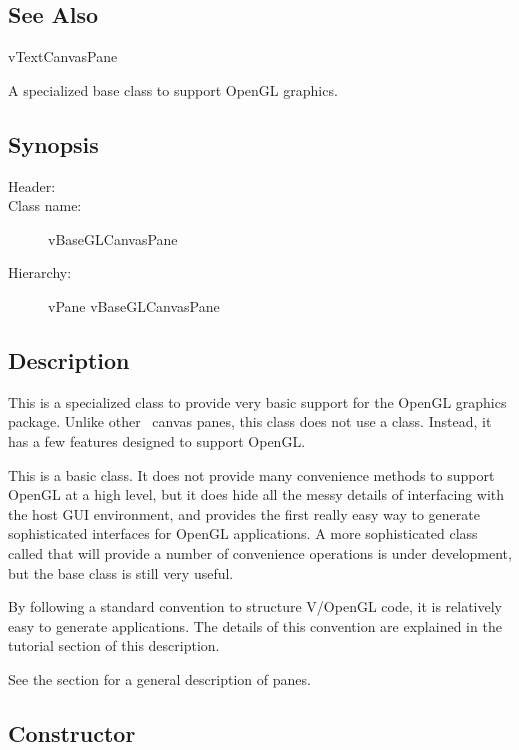 \subsection* {See Also} %

vTextCanvasPane


A specialized base class to support OpenGL graphics.

\subsection* {Synopsis}

\begin{description}
	\item [Header:] 
	\item [Class name:] vBaseGLCanvasPane
 	\item [Hierarchy:] vPane \rta vBaseGLCanvasPane
\end{description}

\subsection* {Description}

This is a specialized class to provide very basic support
for the OpenGL graphics package. Unlike other \V\ canvas
panes, this class does not use a  class. Instead,
it has a few features designed to support OpenGL.

This is a basic class. It does not provide many convenience
methods to support OpenGL at a high level, but it does hide
all the messy details of interfacing with the host GUI
environment, and provides the first really easy way to
generate sophisticated interfaces for OpenGL applications.
A more sophisticated class
called  that will provide a number
of convenience operations is under development, but the
base class is still very useful.

By following a standard convention to structure V/OpenGL
code, it is relatively easy to generate applications.
The details of this convention are explained in the tutorial
section of this description.

See the section  for a general description of panes.

\subsection* {Constructor} %

